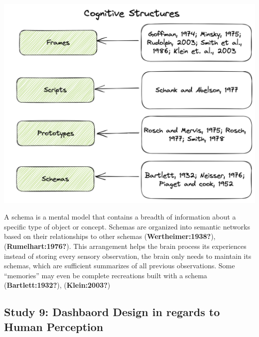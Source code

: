 \documentclass[print]{nuthesis}
\begin{document}
\includegraphics[width=\textwidth]{figure/CognitiveStructuresCitationTimeline}

A schema is a mental model that contains a breadth of information about a specific type of object or concept. Schemas are organized into semantic networks based on their relationships to other schemas (\textbf{Wertheimer:1938?}), (\textbf{Rumelhart:1976?}). This arrangement helps the brain process its experiences instead of storing every sensory observation, the brain only needs to maintain its schemas, which are sufficient summarizes of all previous observations. Some ``memories'' may even be complete recreations built with a schema (\textbf{Bartlett:1932?}), (\textbf{Klein:2003?})

\hypertarget{study-9-dashbaord-design-in-regards-to-human-perception}{%
\subsection{Study 9: Dashbaord Design in regards to Human Perception}\label{study-9-dashbaord-design-in-regards-to-human-perception}}
\end{document}
